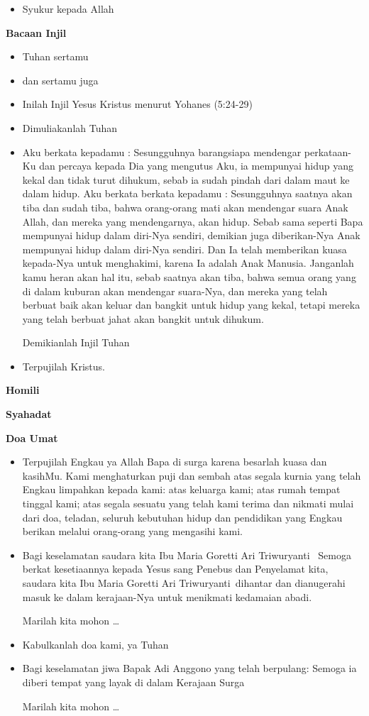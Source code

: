 \documentclass[a5paper,headsepline,titlepage,11pt,normalheadings,DIVcalc]{scrbook}
\makeatletter
\newcommand{\subjudul}[1]{%
  {\parindent \z@ 
    \interlinepenalty\@M \bfseries #1\par\nobreak \vskip 10\p@ }}
\newcommand{\BU}[1]{\begin{itemize} \item[U:] #1 \end{itemize}}
\newcommand{\BI}[1]{\begin{itemize} \item[I:] #1 \end{itemize}}
\newcommand{\BP}[1]{\begin{itemize} \item[P:] #1 \end{itemize}}
\newcommand{\namaalm}{Ibu Maria Goretti Ari Triwuryanti~}
\makeatother
\begin{document}
\BU{Syukur kepada Allah}
\subjudul{Bacaan Injil}

\BI{Tuhan sertamu}

\BU{dan sertamu juga} 

\BI{Inilah Injil Yesus Kristus menurut Yohanes (5:24-29)}

\BU{Dimuliakanlah Tuhan}

\BI{Aku berkata kepadamu : Sesungguhnya barangsiapa
mendengar perkataan-Ku dan percaya kepada Dia yang
mengutus Aku, ia mempunyai hidup yang kekal dan tidak
turut dihukum, sebab ia sudah pindah dari dalam maut ke
dalam hidup. Aku berkata berkata kepadamu :
Sesungguhnya saatnya akan tiba dan sudah tiba, bahwa
orang-orang mati akan mendengar suara Anak Allah, dan
mereka yang mendengarnya, akan hidup. Sebab sama
seperti Bapa mempunyai hidup dalam diri-Nya sendiri,
demikian juga diberikan-Nya Anak mempunyai hidup
dalam diri-Nya sendiri. Dan Ia telah memberikan kuasa
kepada-Nya untuk menghakimi, karena Ia adalah Anak
Manusia. Janganlah kamu heran akan hal itu, sebab saatnya
akan tiba, bahwa semua orang yang di dalam kuburan akan
mendengar suara-Nya, dan mereka yang telah berbuat baik
akan keluar dan bangkit untuk hidup yang kekal, tetapi
mereka yang telah berbuat jahat akan bangkit untuk
dihukum.

Demikianlah Injil Tuhan}

\BU{Terpujilah Kristus.}

 

\subjudul{Homili}

\subjudul{Syahadat} 

\subjudul{Doa Umat}

\BI{Terpujilah Engkau ya Allah Bapa di surga karena besarlah kuasa 
dan kasihMu. Kami menghaturkan puji dan sembah atas segala 
kurnia yang telah Engkau limpahkan kepada kami: atas keluarga 
kami; atas rumah tempat tinggal kami; atas segala sesuatu yang 
telah kami terima dan nikmati mulai dari doa, teladan, seluruh 
kebutuhan hidup dan pendidikan yang Engkau berikan melalui 
orang-orang yang mengasihi kami.}

\BP{Bagi keselamatan saudara kita \namaalm
Semoga berkat kesetiaannya kepada Yesus sang Penebus
dan Penyelamat kita, saudara kita \namaalm dihantar dan
dianugerahi masuk ke dalam kerajaan-Nya untuk
menikmati kedamaian abadi.

Marilah kita mohon \ldots}

\BU{Kabulkanlah doa kami, ya Tuhan}

\BP{Bagi keselamatan jiwa Bapak Adi Anggono yang telah berpulang: Semoga ia diberi tempat yang layak di dalam Kerajaan Surga

Marilah kita mohon \ldots}
\end{document}
